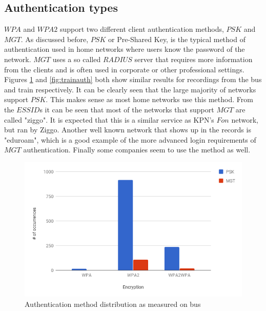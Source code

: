 \documentclass[letterpaper, 10 pt, conference]{ieeeconf}  %
\begin{document}
\subsection{Authentication types}
$WPA$ and $WPA2$ support two different client authentication methods, $PSK$ and $MGT$. As discussed before, $PSK$ or Pre-Shared Key, is the typical method of authentication used in home networks where users know the password of the network. $MGT$ uses a so called $RADIUS$ server that requires more information from the clients and is often used in corporate or other professional settings. Figures \ref{fig:busauth} and \ref{fig:trainauth} both show similar results for recordings from the bus and train respectively. It can be clearly seen that the large majority of networks support $PSK$. This makes sense as most home networks use this method. From the $ESSID$s it can be seen that most of the networks that support $MGT$ are called "ziggo". It is expected that this is a similar service as KPN's $Fon$ network, but ran by Ziggo. Another well known network that shows up in the records is "eduroam", which is a good example of the more advanced login requirements of $MGT$ authentication. Finally some companies seem to use the method as well.

\begin{figure}[h]
\includegraphics[scale=0.4]{Figures/AuthBus.png}
\caption{Authentication method distribution as measured on bus}
\label{fig:busauth}
\end{figure}
\end{document}
